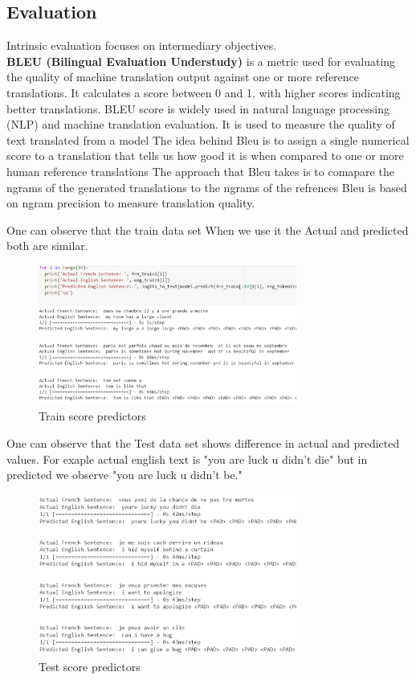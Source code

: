 \documentclass{article}
\begin{document}
\subsection{Evaluation}
Intrinsic evaluation focuses on intermediary objectives.\\ \textbf{BLEU (Bilingual Evaluation Understudy)} is a metric used for evaluating the quality of machine translation output against one or more reference translations. It calculates a score between 0 and 1, with higher scores indicating better translations. BLEU score is widely used in natural language processing (NLP) and machine translation evaluation. 
\cite{NIPS2014_a14ac55a}
It is used to measure the quality of text translated from a model The idea behind Bleu is to assign a single numerical score to a translation that tells us how good it is when compared to one or more human reference translations The approach that Bleu takes is to comapare the ngrams of the generated translations to the ngrams of the refrences Bleu is based on ngram precision to measure translation quality.

One can observe that the train data set When we use it the Actual and predicted both are similar.

\begin{figure}[htp]
    \centering
    \includegraphics[width=8.5cm]{9.PNG}
    \caption{Train score predictors}
    \label{fig:galaxy}
\end{figure}

One can observe that the Test data set shows difference in actual and predicted values. For exaple actual english text is "you are luck u didn't die" but in predicted we observe "you are luck u didn't be."

\begin{figure}[htp]
    \centering
    \includegraphics[width=8.5cm]{10.PNG}
    \caption{Test score predictors}
    \label{fig:galaxy}
\end{figure}
\end{document}
